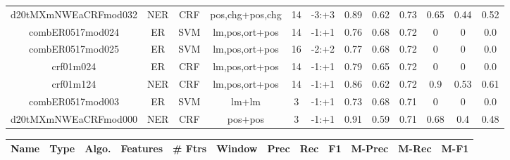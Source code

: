 \documentclass[a4paper]{article}
\begin{document}
\begin{landscape}
\begin{center}
\begin{tabular}{ |c|c|c|c|c|c|c|c|c|c|c|c|}
 	
 
 	
 		
 		\small{ d20tMXmNWEaCRFmod032 } & NER & CRF & pos,chg+pos,chg  &  14 &  -3:+3  &  0.89 & 0.62 & 0.73  &  0.65 & 0.44 & 0.52 \\
 		

 	
 
 	
 		
 		\small{ combER0517mod024 } & ER & SVM & lm,pos,ort+pos  &  14 &  -1:+1  &  0.76 & 0.68 & 0.72  &  0 & 0 & 0.0 \\
 		

 	
 
 	
 		
 		\small{ combER0517mod025 } & ER & SVM & lm,pos,ort+pos  &  16 &  -2:+2  &  0.77 & 0.68 & 0.72  &  0 & 0 & 0.0 \\
 		

 	
 
 	
 		
 		\small{ crf01m024 } & ER & CRF & lm,pos,ort+pos  &  14 &  -1:+1  &  0.79 & 0.65 & 0.72  &  0 & 0 & 0.0 \\
 		

 	
 
 	
 		
 		\small{ crf01m124 } & NER & CRF & lm,pos,ort+pos  &  14 &  -1:+1  &  0.86 & 0.62 & 0.72  &  0.9 & 0.53 & 0.61 \\
 		

 	
 
 	
 		
 		\small{ combER0517mod003 } & ER & SVM & lm+lm  &  3 &  -1:+1  &  0.73 & 0.68 & 0.71  &  0 & 0 & 0.0 \\
 		

 	
 
 	
 		
 		\small{ d20tMXmNWEaCRFmod000 } & NER & CRF & pos+pos  &  3 &  -1:+1  &  0.91 & 0.59 & 0.71  &  0.68 & 0.4 & 0.48 \\
 		
 \hline
\end{tabular}
\end{center}




\begin{center}
\begin{tabular}{ |c|c|c|c|c|c|c|c|c|c|c|c|} 
 \hline
 	Name & Type & Algo. & Features & \# Ftrs & Window & Prec & Rec & F1 & M-Prec & M-Rec & M-F1\\
 \hline

 		

 	
 

\end{tabular}
\end{center}
\end{landscape}
\end{document}
